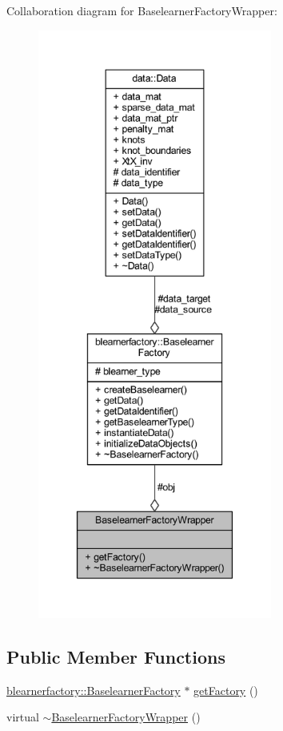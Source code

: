 Collaboration diagram for Baselearner\+Factory\+Wrapper\+:\nopagebreak
\begin{figure}[H]
\begin{center}
\leavevmode
\includegraphics[height=550pt]{class_baselearner_factory_wrapper__coll__graph}
\end{center}
\end{figure}
\subsection*{Public Member Functions}
\begin{DoxyCompactItemize}
\item 
\mbox{\hyperlink{classblearnerfactory_1_1_baselearner_factory}{blearnerfactory\+::\+Baselearner\+Factory}} $\ast$ \mbox{\hyperlink{class_baselearner_factory_wrapper_ac32811bfb4833aab5d11c7c303070485}{get\+Factory}} ()
\item 
virtual \mbox{\hyperlink{class_baselearner_factory_wrapper_a3c8ce56cb52b424af5369a7e3945b937}{$\sim$\+Baselearner\+Factory\+Wrapper}} ()
\end{DoxyCompactItemize}
